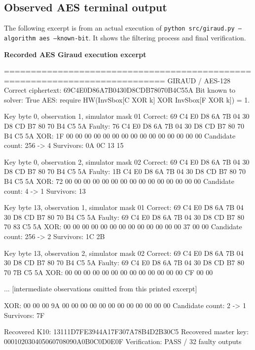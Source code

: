 \subsection{Observed AES terminal output}
The following excerpt is from an actual execution of \texttt{python src/giraud.py --algorithm aes --known-bit}. It shows the filtering process and final verification.
\par\smallskip\noindent\textbf{Recorded AES Giraud execution excerpt}\par
\begin{lightcode}

============================================================================
GIRAUD / AES-128
Correct ciphertext: 69C4E0D86A7B0430D8CDB78070B4C55A
Bit known to solver: True
AES: require HW(InvSbox[C XOR k] XOR InvSbox[F XOR k]) = 1.

Key byte 0, observation 1, simulator mask 01
Correct: 69 C4 E0 D8 6A 7B 04 30 D8 CD B7 80 70 B4 C5 5A
Faulty:  76 C4 E0 D8 6A 7B 04 30 D8 CD B7 80 70 B4 C5 5A
XOR:     1F 00 00 00 00 00 00 00 00 00 00 00 00 00 00 00
Candidate count: 256 -> 4
Survivors: 0A 0C 13 15

Key byte 0, observation 2, simulator mask 02
Correct: 69 C4 E0 D8 6A 7B 04 30 D8 CD B7 80 70 B4 C5 5A
Faulty:  1B C4 E0 D8 6A 7B 04 30 D8 CD B7 80 70 B4 C5 5A
XOR:     72 00 00 00 00 00 00 00 00 00 00 00 00 00 00 00
Candidate count: 4 -> 1
Survivors: 13

Key byte 13, observation 1, simulator mask 01
Correct: 69 C4 E0 D8 6A 7B 04 30 D8 CD B7 80 70 B4 C5 5A
Faulty:  69 C4 E0 D8 6A 7B 04 30 D8 CD B7 80 70 83 C5 5A
XOR:     00 00 00 00 00 00 00 00 00 00 00 00 00 37 00 00
Candidate count: 256 -> 2
Survivors: 1C 2B

Key byte 13, observation 2, simulator mask 02
Correct: 69 C4 E0 D8 6A 7B 04 30 D8 CD B7 80 70 B4 C5 5A
Faulty:  69 C4 E0 D8 6A 7B 04 30 D8 CD B7 80 70 7B C5 5A
XOR:     00 00 00 00 00 00 00 00 00 00 00 00 00 CF 00 00

... [intermediate observations omitted from this printed excerpt]

XOR:     00 00 00 9A 00 00 00 00 00 00 00 00 00 00 00 00
Candidate count: 2 -> 1
Survivors: 7F

Recovered K10: 13111D7FE3944A17F307A78B4D2B30C5
Recovered master key: 000102030405060708090A0B0C0D0E0F
Verification: PASS / 32 faulty outputs
\end{lightcode}

